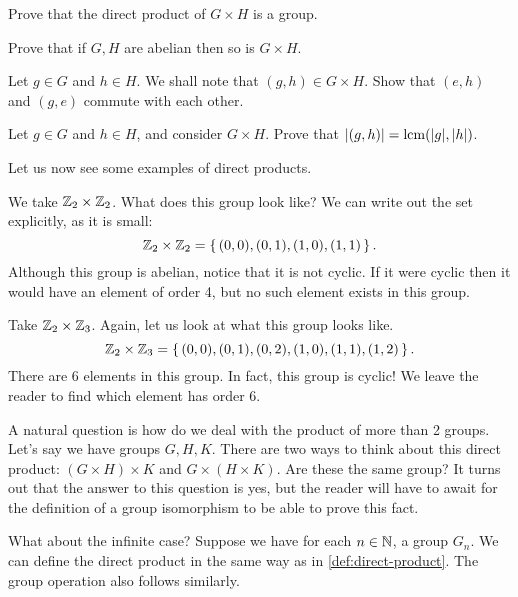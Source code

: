 \documentclass[./main.tex]{subfiles}
\begin{document}
\begin{exercise}
    Prove that the direct product of $G \times H$ is a group.
\end{exercise}
\begin{exercise}
    Prove that if $G, H$ are abelian then so is $G \times H$.
\end{exercise}
\begin{exercise}
    Let $g \in G$ and $h \in H$. We shall note that $(g,h) \in G \times H$. Show
    that $(e, h)$ and $(g, e)$ commute with each other. 
\end{exercise}

\begin{exercise}
    Let $g \in G$ and $h \in H$, and consider $G \times H$. Prove that
    $\abs{(g,h)} = \operatorname{lcm}(\abs g, \abs h)$. 
\end{exercise}

Let us now see some examples of direct products.

\begin{example}
    We take $\mathbb{Z}_2 \times \mathbb{Z}_2$. What does this group look like? We can 
    write out the set explicitly, as it is small: 
    \[
        \mathbb{Z}_2 \times \mathbb{Z}_2 = \set{(0,0), (0,1), (1,0), (1,1)}.
    \]
    Although this group is abelian, notice that it is not cyclic. If it were
    cyclic then it would have an element of order 4, but no such element exists
    in this group.
\end{example}

\begin{example}
    Take $\mathbb{Z}_2 \times \mathbb{Z}_3$. Again, let us look at what this group looks like.
    \[
        \mathbb{Z}_2 \times \mathbb{Z}_3 = \set{(0,0), (0,1), (0,2), (1,0), (1,1), (1,2)}.
    \]
    There are 6 elements in this group. In fact, this group is cyclic! We leave
    the reader to find which element has order 6.
\end{example}

A natural question is how do we deal with the product of more than 2 groups.
Let's say we have groups $G, H, K$. There are two ways to think about this
direct product: $(G \times H) \times K$ and $G \times (H \times K)$. Are these
the same group? It turns out that the answer to this question is yes, but the
reader will have to await for the definition of a group isomorphism to be able
to prove this fact.

What about the infinite case? Suppose we have for each $n \in \mathbb{N}$, a group
$G_n$. We can define the direct product in the same way as in
\cref{def:direct-product}. The group operation also follows similarly.
\end{document}
